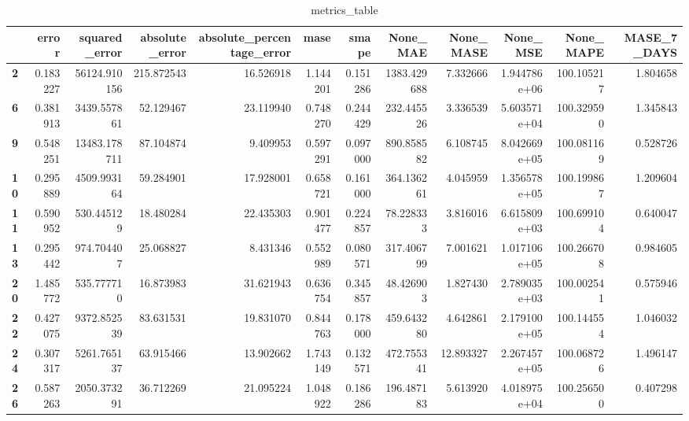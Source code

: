 \begin{table}[h]
\centering
\caption{metrics_table}
\label{table:Final tune for dataset 1 lstm local unviariate. After smape fix}
\begin{tabular}{lrrrrrrrrrrr}
\toprule
{} &     error &  squared\_error &  absolute\_error &  absolute\_percentage\_error &      mase &     smape &     None\_MAE &  None\_MASE &      None\_MSE &   None\_MAPE &  MASE\_7\_DAYS \\
\midrule
\textbf{2 } &  0.183227 &   56124.910156 &      215.872543 &                  16.526918 &  1.144201 &  0.151286 &  1383.429688 &   7.332666 &  1.944786e+06 &  100.105217 &     1.804658 \\
\textbf{6 } &  0.381913 &    3439.557861 &       52.129467 &                  23.119940 &  0.748270 &  0.244429 &   232.445526 &   3.336539 &  5.603571e+04 &  100.329590 &     1.345843 \\
\textbf{9 } &  0.548251 &   13483.178711 &       87.104874 &                   9.409953 &  0.597291 &  0.097000 &   890.858582 &   6.108745 &  8.042669e+05 &  100.081169 &     0.528726 \\
\textbf{10} &  0.295889 &    4509.993164 &       59.284901 &                  17.928001 &  0.658721 &  0.161000 &   364.136261 &   4.045959 &  1.356578e+05 &  100.199867 &     1.209604 \\
\textbf{11} &  0.590952 &     530.445129 &       18.480284 &                  22.435303 &  0.901477 &  0.224857 &    78.228333 &   3.816016 &  6.615809e+03 &  100.699104 &     0.640047 \\
\textbf{13} &  0.295442 &     974.704407 &       25.068827 &                   8.431346 &  0.552989 &  0.080571 &   317.406799 &   7.001621 &  1.017106e+05 &  100.266708 &     0.984605 \\
\textbf{20} &  1.485772 &     535.777710 &       16.873983 &                  31.621943 &  0.636754 &  0.345857 &    48.426903 &   1.827430 &  2.789035e+03 &  100.002541 &     0.575946 \\
\textbf{22} &  0.427075 &    9372.852539 &       83.631531 &                  19.831070 &  0.844763 &  0.178000 &   459.643280 &   4.642861 &  2.179100e+05 &  100.144554 &     1.046032 \\
\textbf{24} &  0.307317 &    5261.765137 &       63.915466 &                  13.902662 &  1.743149 &  0.132571 &   472.755341 &  12.893327 &  2.267457e+05 &  100.068726 &     1.496147 \\
\textbf{26} &  0.587263 &    2050.373291 &       36.712269 &                  21.095224 &  1.048922 &  0.186286 &   196.487183 &   5.613920 &  4.018975e+04 &  100.256500 &     0.407298 \\

\end{tabular}
\end{table}
